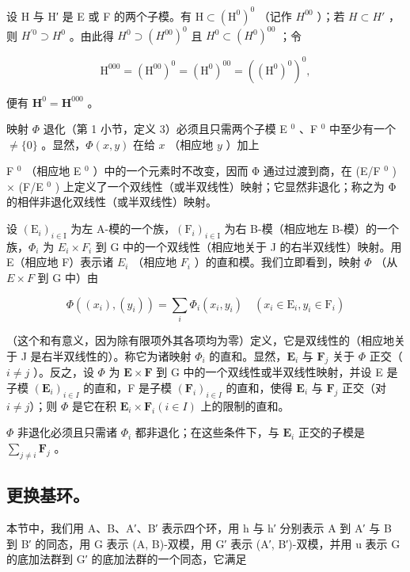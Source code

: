 设 H 与 H′ 是 E 或 F 的两个子模。有 \(\mathrm{H}\subset(\mathrm{H}^{0})^{0}\) （记作 \(H^{00}\) ）；若 \(H\subset H'\) ，则 \(H^{\prime0}\supset H^{0}\) 。由此得 \(H^{0}\supset(H^{00})^{0}\) 且 \(H^{0}\subset(H^{0})^{00}\) ；令

\[
\mathrm{H} ^ {0 0 0} = (\mathrm{H} ^ {0 0}) ^ {0} = (\mathrm{H} ^ {0}) ^ {0 0} = ((\mathrm{H} ^ {0}) ^ {0}) ^ {0},
\]

便有 \(\mathbf{H}^0 = \mathbf{H}^{000}\) 。

映射 \(\Phi\) 退化（第 1 小节，定义 3）必须且只需两个子模 E \(^{0}\) 、F \(^{0}\) 中至少有一个 \(\neq \{0\}\) 。显然，\(\Phi(x, y)\) 在给 \(x\) （相应地 \(y\) ）加上

F \(^{0}\) （相应地 E \(^{0}\) ）中的一个元素时不改变，因而 Φ 通过过渡到商，在 (E/F \(^{0}\) ) × (F/E \(^{0}\) ) 上定义了一个双线性（或半双线性）映射；它显然非退化；称之为 Φ 的相伴非退化双线性（或半双线性）映射。

设 \((\mathrm{E}_{i})_{i\in\mathrm{I}}\) 为左 A-模的一个族，\((\mathrm{F}_{i})_{i\in\mathrm{I}}\) 为右 B-模（相应地左 B-模）的一个族，\(\Phi_{i}\) 为 \(E_{i}\times F_{i}\) 到 G 中的一个双线性（相应地关于 J 的右半双线性）映射。用 E（相应地 F）表示诸 \(E_{i}\) （相应地 \(F_{i}\) ）的直和模。我们立即看到，映射 \(\Phi\) （从 \(E\times F\) 到 G 中）由

\[
\Phi ((x _ {i}), (y _ {i})) = \sum_ {i} \Phi_ {i} (x _ {i}, y _ {i}) \quad (x _ {i} \in \mathrm{E} _ {i}, y _ {i} \in \mathrm{F} _ {i})\tag{10}
\]

（这个和有意义，因为除有限项外其各项均为零）定义，它是双线性的（相应地关于 J 是右半双线性的）。称它为诸映射 \(\Phi_{i}\) 的直和。显然，\(\mathbf{E}_{i}\) 与 \(\mathbf{F}_{j}\) 关于 \(\Phi\) 正交（\(i \neq j\) ）。反之，设 \(\Phi\) 为 \(\mathbf{E} \times \mathbf{F}\) 到 G 中的一个双线性或半双线性映射，并设 E 是子模 \((\mathbf{E}_{i})_{i \in I}\) 的直和，F 是子模 \((\mathbf{F}_{i})_{i \in I}\) 的直和，使得 \(\mathbf{E}_{i}\) 与 \(\mathbf{F}_{j}\) 正交（对 \(i \neq j\)）；则 \(\Phi\) 是它在积 \(\mathbf{E}_{i} \times \mathbf{F}_{i} (i \in I)\) 上的限制的直和。

\(\Phi\) 非退化必须且只需诸 \(\Phi_{i}\) 都非退化；在这些条件下，与 \(\mathbf{E}_{i}\) 正交的子模是 \(\sum_{j\neq i}\mathbf{F}_{j}\) 。

\subsection{更换基环。}

本节中，我们用 A、B、A′、B′ 表示四个环，用 h 与 h′ 分别表示 A 到 A′ 与 B 到 B′ 的同态，用 G 表示 (A, B)-双模，用 G′ 表示 (A′, B′)-双模，并用 u 表示 G 的底加法群到 G′ 的底加法群的一个同态，它满足

